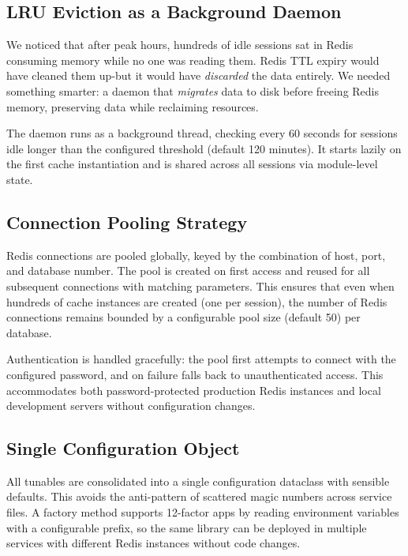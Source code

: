 \documentclass[conference]{IEEEtran}
\begin{document}
\subsection{LRU Eviction as a Background Daemon}

We noticed that after peak hours, hundreds of idle sessions sat in Redis consuming memory while no one was reading them. Redis TTL expiry would have cleaned them up-but it would have \emph{discarded} the data entirely. We needed something smarter: a daemon that \emph{migrates} data to disk before freeing Redis memory, preserving data while reclaiming resources.

The daemon runs as a background thread, checking every 60 seconds for sessions idle longer than the configured threshold (default 120 minutes). It starts lazily on the first cache instantiation and is shared across all sessions via module-level state.

\subsection{Connection Pooling Strategy}

Redis connections are pooled globally, keyed by the combination of host, port, and database number. The pool is created on first access and reused for all subsequent connections with matching parameters. This ensures that even when hundreds of cache instances are created (one per session), the number of Redis connections remains bounded by a configurable pool size (default 50) per database.

Authentication is handled gracefully: the pool first attempts to connect with the configured password, and on failure falls back to unauthenticated access. This accommodates both password-protected production Redis instances and local development servers without configuration changes.

\subsection{Single Configuration Object}

All tunables are consolidated into a single configuration dataclass with sensible defaults. This avoids the anti-pattern of scattered magic numbers across service files. A factory method supports 12-factor apps by reading environment variables with a configurable prefix, so the same library can be deployed in multiple services with different Redis instances without code changes.
\end{document}
